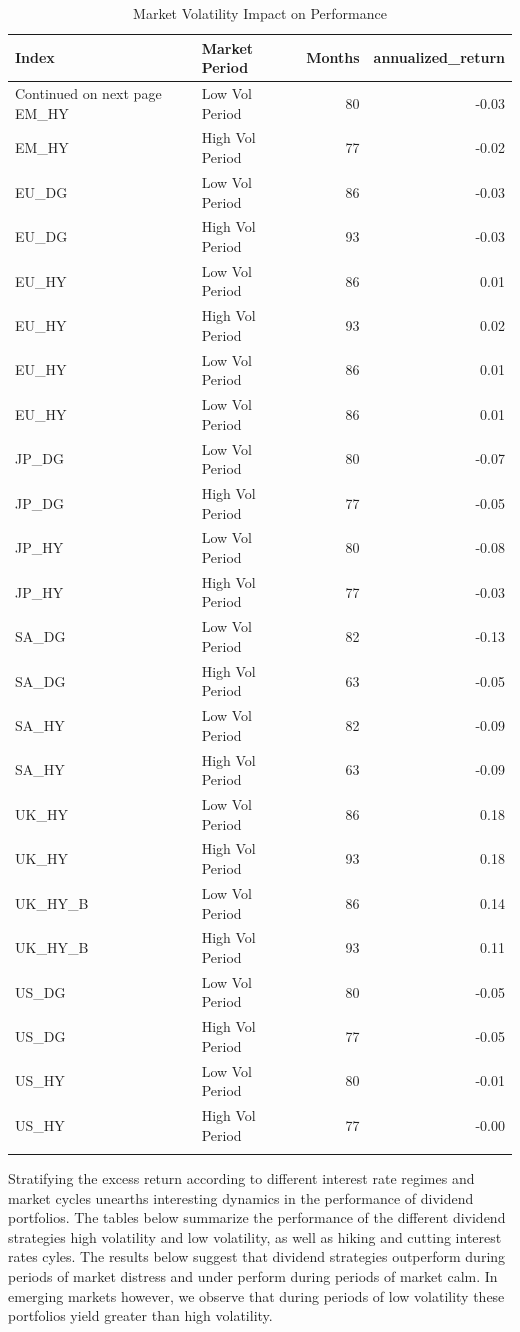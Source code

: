 \documentclass[11pt,preprint, authoryear]{elsarticle}
\numberwithin{equation}{section}
\numberwithin{figure}{section}
\numberwithin{table}{section}
\begin{document}
\begin{longtable}{llrr}
  \toprule
Index & Market Period & Months & annualized\_return \\ 
  \hline 
\endhead 
\hline 
{\footnotesize Continued on next page} 
\endfoot 
\endlastfoot 
 \midrule
EM\_HY & Low Vol Period &  80 & -0.03 \\ 
  EM\_HY & High Vol Period &  77 & -0.02 \\ 
  EU\_DG & Low Vol Period &  86 & -0.03 \\ 
  EU\_DG & High Vol Period &  93 & -0.03 \\ 
  EU\_HY & Low Vol Period &  86 & 0.01 \\ 
  EU\_HY & High Vol Period &  93 & 0.02 \\ 
  EU\_HY & Low Vol Period &  86 & 0.01 \\ 
  EU\_HY & Low Vol Period &  86 & 0.01 \\ 
  JP\_DG & Low Vol Period &  80 & -0.07 \\ 
  JP\_DG & High Vol Period &  77 & -0.05 \\ 
  JP\_HY & Low Vol Period &  80 & -0.08 \\ 
  JP\_HY & High Vol Period &  77 & -0.03 \\ 
  SA\_DG & Low Vol Period &  82 & -0.13 \\ 
  SA\_DG & High Vol Period &  63 & -0.05 \\ 
  SA\_HY & Low Vol Period &  82 & -0.09 \\ 
  SA\_HY & High Vol Period &  63 & -0.09 \\ 
  UK\_HY & Low Vol Period &  86 & 0.18 \\ 
  UK\_HY & High Vol Period &  93 & 0.18 \\ 
  UK\_HY\_B & Low Vol Period &  86 & 0.14 \\ 
  UK\_HY\_B & High Vol Period &  93 & 0.11 \\ 
  US\_DG & Low Vol Period &  80 & -0.05 \\ 
  US\_DG & High Vol Period &  77 & -0.05 \\ 
  US\_HY & Low Vol Period &  80 & -0.01 \\ 
  US\_HY & High Vol Period &  77 & -0.00 \\ 
   \bottomrule
\caption{Market Volatility Impact on Performance} 
\end{longtable}
\endgroup

Stratifying the excess return according to different interest rate
regimes and market cycles unearths interesting dynamics in the
performance of dividend portfolios. The tables below summarize the
performance of the different dividend strategies high volatility and low
volatility, as well as hiking and cutting interest rates cyles. The
results below suggest that dividend strategies outperform during periods
of market distress and under perform during periods of market calm. In
emerging markets however, we observe that during periods of low
volatility these portfolios yield greater than high volatility.
\end{document}
